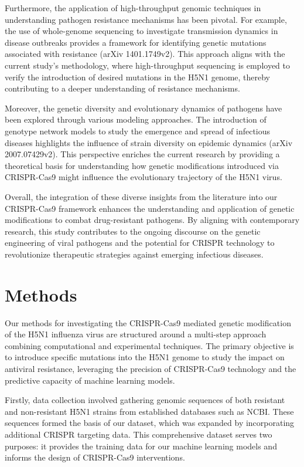 \documentclass{article}
\begin{document}
Furthermore, the application of high-throughput genomic techniques in understanding pathogen resistance mechanisms has been pivotal. For example, the use of whole-genome sequencing to investigate transmission dynamics in disease outbreaks provides a framework for identifying genetic mutations associated with resistance (arXiv 1401.1749v2). This approach aligns with the current study's methodology, where high-throughput sequencing is employed to verify the introduction of desired mutations in the H5N1 genome, thereby contributing to a deeper understanding of resistance mechanisms.

Moreover, the genetic diversity and evolutionary dynamics of pathogens have been explored through various modeling approaches. The introduction of genotype network models to study the emergence and spread of infectious diseases highlights the influence of strain diversity on epidemic dynamics (arXiv 2007.07429v2). This perspective enriches the current research by providing a theoretical basis for understanding how genetic modifications introduced via CRISPR-Cas9 might influence the evolutionary trajectory of the H5N1 virus.

Overall, the integration of these diverse insights from the literature into our CRISPR-Cas9 framework enhances the understanding and application of genetic modifications to combat drug-resistant pathogens. By aligning with contemporary research, this study contributes to the ongoing discourse on the genetic engineering of viral pathogens and the potential for CRISPR technology to revolutionize therapeutic strategies against emerging infectious diseases.

\section{Methods}
Our methods for investigating the CRISPR-Cas9 mediated genetic modification of the H5N1 influenza virus are structured around a multi-step approach combining computational and experimental techniques. The primary objective is to introduce specific mutations into the H5N1 genome to study the impact on antiviral resistance, leveraging the precision of CRISPR-Cas9 technology and the predictive capacity of machine learning models.

Firstly, data collection involved gathering genomic sequences of both resistant and non-resistant H5N1 strains from established databases such as NCBI. These sequences formed the basis of our dataset, which was expanded by incorporating additional CRISPR targeting data. This comprehensive dataset serves two purposes: it provides the training data for our machine learning models and informs the design of CRISPR-Cas9 interventions.
\end{document}

